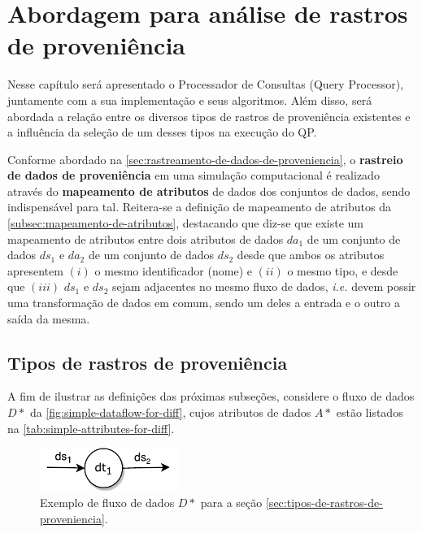 
\chapter{Abordagem para análise de rastros de proveniência}%
\label{chap:rastros-de-proveniencia}

Nesse capítulo será apresentado o Processador de Consultas (Query Processor), juntamente com a sua implementação e seus algoritmos. Além disso, será abordada a relação entre os diversos tipos de rastros de proveniência existentes e a influência da seleção de um desses tipos na execução do QP.


Conforme abordado na \autoref{sec:rastreamento-de-dados-de-proveniencia}, o \textbf{rastreio de dados de proveniência} em uma simulação computacional é realizado através do \textbf{mapeamento de atributos} de dados dos conjuntos de dados, sendo indispensável para tal. Reitera-se a definição de mapeamento de atributos da \autoref{subsec:mapeamento-de-atributos}, destacando que diz-se que existe um mapeamento de atributos entre dois atributos de dados \(da_1\) de um conjunto de dados \(ds_1\) e \(da_2\) de um conjunto de dados \(ds_2\) desde que ambos os atributos apresentem \((i)\) o mesmo identificador (nome) e \((ii)\) o mesmo tipo, e desde que \((iii)\) \(ds_1\) e \(ds_2\) sejam adjacentes no mesmo fluxo de dados, \textit{i.e.} devem possir uma transformação de dados em comum, sendo um deles a entrada e o outro a saída da mesma.

\section{Tipos de rastros de proveniência}%
\label{sec:tipos-de-rastros-de-proveniencia}


A fim de ilustrar as definições das próximas subseções, considere o fluxo de dados  \(D\ast\) da \autoref{fig:simple-dataflow-for-diff}, cujos atributos de dados \(A\ast\) estão listados na \autoref{tab:simple-attributes-for-diff}. 

\begin{figure}[htb]
    \centering
    \includegraphics[width=0.4\textwidth]{img/simple-dataflow-for-diff}
    \caption[Exemplo de fluxo de dados para a seção \autoref{sec:tipos-de-rastros-de-proveniencia}]{Exemplo de fluxo de dados \(D\ast\) para a seção \autoref{sec:tipos-de-rastros-de-proveniencia}.}%
    \label{fig:simple-dataflow-for-diff}
\end{figure}

